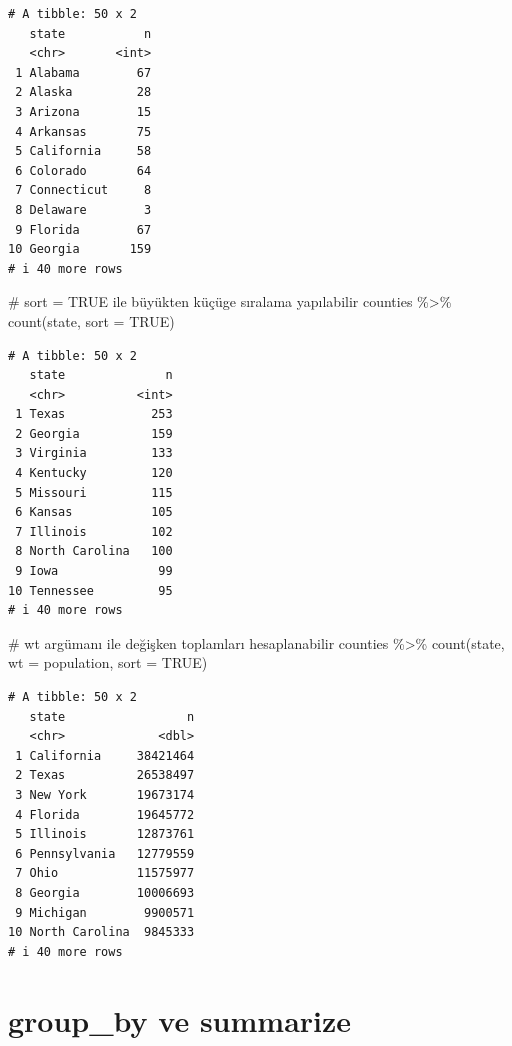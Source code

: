 \documentclass[
  letterpaper,
  DIV=11,
  numbers=noendperiod]{scrreprt}
\newenvironment{Shaded}{\begin{snugshade}}{\end{snugshade}}
\newcommand{\AttributeTok}[1]{\textcolor[rgb]{0.40,0.45,0.13}{#1}}
\newcommand{\CommentTok}[1]{\textcolor[rgb]{0.37,0.37,0.37}{#1}}
\newcommand{\ConstantTok}[1]{\textcolor[rgb]{0.56,0.35,0.01}{#1}}
\newcommand{\FunctionTok}[1]{\textcolor[rgb]{0.28,0.35,0.67}{#1}}
\newcommand{\NormalTok}[1]{\textcolor[rgb]{0.00,0.23,0.31}{#1}}
\newcommand{\SpecialCharTok}[1]{\textcolor[rgb]{0.37,0.37,0.37}{#1}}
\begin{document}
\begin{verbatim}
# A tibble: 50 x 2
   state           n
   <chr>       <int>
 1 Alabama        67
 2 Alaska         28
 3 Arizona        15
 4 Arkansas       75
 5 California     58
 6 Colorado       64
 7 Connecticut     8
 8 Delaware        3
 9 Florida        67
10 Georgia       159
# i 40 more rows
\end{verbatim}

\begin{Shaded}
\begin{Highlighting}[]
\CommentTok{\# sort = TRUE ile büyükten küçüge sıralama yapılabilir}
\NormalTok{counties }\SpecialCharTok{\%\textgreater{}\%}
\FunctionTok{count}\NormalTok{(state, }\AttributeTok{sort =} \ConstantTok{TRUE}\NormalTok{)}
\end{Highlighting}
\end{Shaded}

\begin{verbatim}
# A tibble: 50 x 2
   state              n
   <chr>          <int>
 1 Texas            253
 2 Georgia          159
 3 Virginia         133
 4 Kentucky         120
 5 Missouri         115
 6 Kansas           105
 7 Illinois         102
 8 North Carolina   100
 9 Iowa              99
10 Tennessee         95
# i 40 more rows
\end{verbatim}

\begin{Shaded}
\begin{Highlighting}[]
\CommentTok{\# wt argümanı ile değişken toplamları hesaplanabilir}
\NormalTok{counties }\SpecialCharTok{\%\textgreater{}\%}
\FunctionTok{count}\NormalTok{(state, }\AttributeTok{wt =}\NormalTok{ population, }\AttributeTok{sort =} \ConstantTok{TRUE}\NormalTok{)}
\end{Highlighting}
\end{Shaded}

\begin{verbatim}
# A tibble: 50 x 2
   state                 n
   <chr>             <dbl>
 1 California     38421464
 2 Texas          26538497
 3 New York       19673174
 4 Florida        19645772
 5 Illinois       12873761
 6 Pennsylvania   12779559
 7 Ohio           11575977
 8 Georgia        10006693
 9 Michigan        9900571
10 North Carolina  9845333
# i 40 more rows
\end{verbatim}

\hypertarget{group_by-ve-summarize}{%
\section*{group\_by ve summarize}\label{group_by-ve-summarize}}
\end{document}
